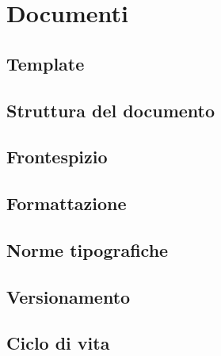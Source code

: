 \section{Documenti}
	\subsection{Template}
	\subsection{Struttura del documento}
	\subsection{Frontespizio}
	\subsection{Formattazione}
	\subsection{Norme tipografiche}
	\subsection{Versionamento}
	\subsection{Ciclo di vita}
